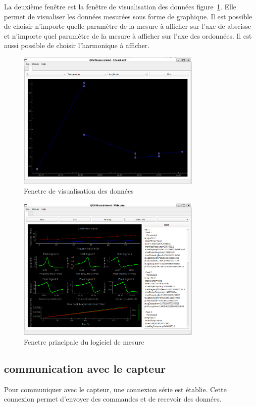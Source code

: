 La deuxième fenêtre est la fenêtre de visualisation des données figure~\ref{fig:plot window}. 
Elle permet de visualiser les données mesurées sous forme de graphique. 
Il est possible de choisir n'importe quelle paramètre de la mesure à afficher sur l'axe de abscisse et n'importe quel paramètre de la mesure à afficher sur l'axe des ordonnées.
Il est aussi possible de choisir l'harmonique à afficher.
\begin{figure}[H]
    \centering
    \includegraphics[width=0.8\textwidth]{assets/figures/Plot_window.png}
    \caption{Fenetre de visualisation des données}
    \label{fig:plot window}
\end{figure}
\begin{figure}[H]
    \centering
    \includegraphics[width=0.8\textwidth]{assets/figures/Programme.png}
    \caption{Fenetre principale du logiciel de mesure}
    \label{fig:main window}
\end{figure}


\subsection{communication avec le capteur}
Pour communiquer avec le capteur, une connexion série est établie. Cette connexion permet d'envoyer des commandes et de recevoir des données.

